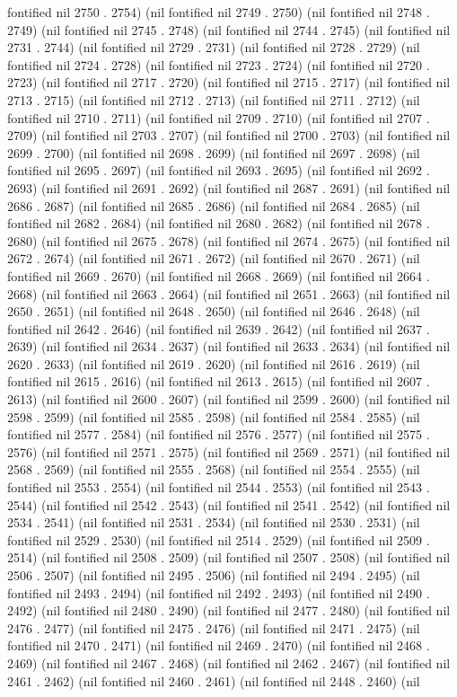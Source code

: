 fontified nil 2750 . 2754) (nil fontified nil 2749 . 2750) (nil fontified nil 2748 . 2749) (nil fontified nil 2745 . 2748) (nil fontified nil 2744 . 2745) (nil fontified nil 2731 . 2744) (nil fontified nil 2729 . 2731) (nil fontified nil 2728 . 2729) (nil fontified nil 2724 . 2728) (nil fontified nil 2723 . 2724) (nil fontified nil 2720 . 2723) (nil fontified nil 2717 . 2720) (nil fontified nil 2715 . 2717) (nil fontified nil 2713 . 2715) (nil fontified nil 2712 . 2713) (nil fontified nil 2711 . 2712) (nil fontified nil 2710 . 2711) (nil fontified nil 2709 . 2710) (nil fontified nil 2707 . 2709) (nil fontified nil 2703 . 2707) (nil fontified nil 2700 . 2703) (nil fontified nil 2699 . 2700) (nil fontified nil 2698 . 2699) (nil fontified nil 2697 . 2698) (nil fontified nil 2695 . 2697) (nil fontified nil 2693 . 2695) (nil fontified nil 2692 . 2693) (nil fontified nil 2691 . 2692) (nil fontified nil 2687 . 2691) (nil fontified nil 2686 . 2687) (nil fontified nil 2685 . 2686) (nil fontified nil 2684 . 2685) (nil fontified nil 2682 . 2684) (nil fontified nil 2680 . 2682) (nil fontified nil 2678 . 2680) (nil fontified nil 2675 . 2678) (nil fontified nil 2674 . 2675) (nil fontified nil 2672 . 2674) (nil fontified nil 2671 . 2672) (nil fontified nil 2670 . 2671) (nil fontified nil 2669 . 2670) (nil fontified nil 2668 . 2669) (nil fontified nil 2664 . 2668) (nil fontified nil 2663 . 2664) (nil fontified nil 2651 . 2663) (nil fontified nil 2650 . 2651) (nil fontified nil 2648 . 2650) (nil fontified nil 2646 . 2648) (nil fontified nil 2642 . 2646) (nil fontified nil 2639 . 2642) (nil fontified nil 2637 . 2639) (nil fontified nil 2634 . 2637) (nil fontified nil 2633 . 2634) (nil fontified nil 2620 . 2633) (nil fontified nil 2619 . 2620) (nil fontified nil 2616 . 2619) (nil fontified nil 2615 . 2616) (nil fontified nil 2613 . 2615) (nil fontified nil 2607 . 2613) (nil fontified nil 2600 . 2607) (nil fontified nil 2599 . 2600) (nil fontified nil 2598 . 2599) (nil fontified nil 2585 . 2598) (nil fontified nil 2584 . 2585) (nil fontified nil 2577 . 2584) (nil fontified nil 2576 . 2577) (nil fontified nil 2575 . 2576) (nil fontified nil 2571 . 2575) (nil fontified nil 2569 . 2571) (nil fontified nil 2568 . 2569) (nil fontified nil 2555 . 2568) (nil fontified nil 2554 . 2555) (nil fontified nil 2553 . 2554) (nil fontified nil 2544 . 2553) (nil fontified nil 2543 . 2544) (nil fontified nil 2542 . 2543) (nil fontified nil 2541 . 2542) (nil fontified nil 2534 . 2541) (nil fontified nil 2531 . 2534) (nil fontified nil 2530 . 2531) (nil fontified nil 2529 . 2530) (nil fontified nil 2514 . 2529) (nil fontified nil 2509 . 2514) (nil fontified nil 2508 . 2509) (nil fontified nil 2507 . 2508) (nil fontified nil 2506 . 2507) (nil fontified nil 2495 . 2506) (nil fontified nil 2494 . 2495) (nil fontified nil 2493 . 2494) (nil fontified nil 2492 . 2493) (nil fontified nil 2490 . 2492) (nil fontified nil 2480 . 2490) (nil fontified nil 2477 . 2480) (nil fontified nil 2476 . 2477) (nil fontified nil 2475 . 2476) (nil fontified nil 2471 . 2475) (nil fontified nil 2470 . 2471) (nil fontified nil 2469 . 2470) (nil fontified nil 2468 . 2469) (nil fontified nil 2467 . 2468) (nil fontified nil 2462 . 2467) (nil fontified nil 2461 . 2462) (nil fontified nil 2460 . 2461) (nil fontified nil 2448 . 2460) (nil 